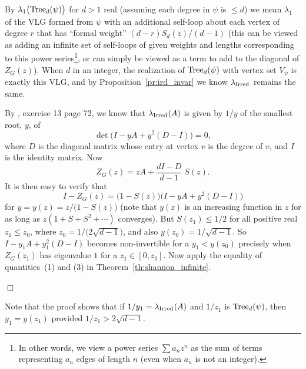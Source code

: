 \documentclass[12pt]{article}
\newcommand{\tang}{{\psi}}	%
\newcommand{\tree}{{\rm Tree}}
\newcommand{\proof}{{\par\noindent {\bf Proof}\space\space}}
\newcommand{\proofbox}{\begin{flushright}$\Box$\end{flushright}}
\newcommand{\ird}[1]{{\rm Irred}_{#1}}
\begin{document}
By $\lambda_1\bigl( \tree_d(\tang) \bigr)$ for $d>1$ real
(assuming each degree in $\tang$ is $\le d$)
we mean $\lambda_1$
of the VLG formed from $\tang$ with an additional self-loop about
each vertex of degree $r$ that has ``formal weight''
$(d-r)S_d(z)/(d-1)$ (this can be viewed as adding an infinite set of self-loops
of given weights and lengths corresponding to this power series\footnote{
	In other words, we view a power series $\sum a_nz^n$ as the sum
	of terms representing
	$a_n$ edges of length $n$ (even when $a_n$ is not an integer).
}, or can simply be viewed as a term to add
to the diagonal of $Z_G(z)$).
When $d$ in an integer, the realization of $\tree_d(\tang)$ with vertex
set $V_\tang$ is exactly this VLG, and by Proposition~\ref{pr:ird_invar}
we know $\lambda_{\ird{}}$ remains the same.
\proof
By \cite{godsil}, exercise 13 page 72, we know that
$\lambda_{\ird{}}(A)$ is given by
$1/y$ of the smallest root, $y$, of
$$
\det\bigl(I-yA+y^2(D-I)\bigr) = 0,
$$
where $D$ is the diagonal matrix whose entry at vertex $v$ is the degree of 
$v$, and $I$ is the identity matrix.  Now
$$
Z_G(z) = zA + \frac{dI-D}{d-1}\; S(z).
$$
It is then easy to verify that
$$
I - Z_G(z) = \bigl( 1-S(z)\bigr) \bigl(I-yA+y^2(D-I)\bigr)
$$
for $y=y(z)=z/\bigl(  1-S(z)\bigr) $ (note that $y(z)$ is an increasing
function in $z$ for as long as $z(1+S+S^2+\cdots)$ converges).  
But $S(z_1)\le 1/2$ for all
positive real $z_1\le z_0$, where $z_0=1/\bigl( 2\sqrt{d-1}\bigr)$,
and also $y(z_0)=1/\sqrt{d-1}$.  So $I-y_1A+y_1^2(D-I)$ becomes non-invertible
for a $y_1<y(z_0)$ precisely when $Z_G(z_1)$ has eigenvalue $1$ for a
$z_1\in [0,z_0]$.  Now apply the equality of quantities~(1) and (3)
in Theorem~\ref{th:shannon_infinite}.
\proofbox
Note that the proof shows that if $1/y_1=\lambda_{\ird{}}(A)$ 
and $1/z_1$ is $\tree_d(\tang)$, then $y_1=y(z_1)$ provided
$1/z_1 > 2\sqrt{d-1}$.




\end{document}
